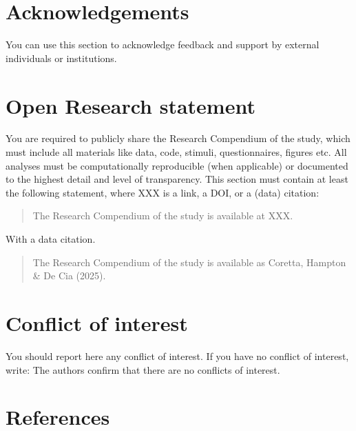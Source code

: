 \documentclass[
]{rrling}
\begin{document}
\section*{Acknowledgements}\label{acknowledgements}

You can use this section to acknowledge feedback and support by external
individuals or institutions.

\section*{Open Research statement}\label{open-research-statement}

You are required to publicly share the Research Compendium of the study,
which must include all materials like data, code, stimuli,
questionnaires, figures etc. All analyses must be computationally
reproducible (when applicable) or documented to the highest detail and
level of transparency. This section must contain at least the following
statement, where XXX is a link, a DOI, or a (data) citation:

\begin{quote}
The Research Compendium of the study is available at XXX.
\end{quote}

With a data citation.

\begin{quote}
The Research Compendium of the study is available as Coretta, Hampton \&
De Cia (2025).
\end{quote}

\section*{Conflict of interest}\label{conflict-of-interest}

You should report here any conflict of interest. If you have no conflict
of interest, write: The authors confirm that there are no conflicts of
interest.

\section*{References}\label{references}
\end{document}
